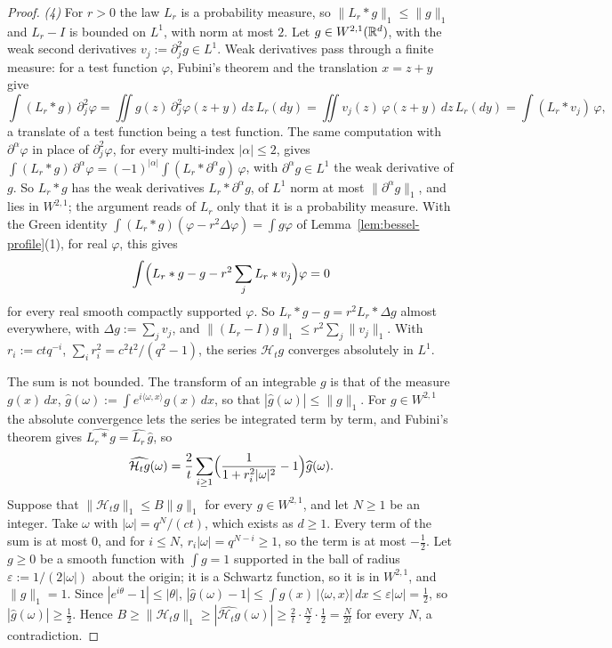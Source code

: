 \begin{proof}
\emph{(4)} For $r > 0$ the law $L_r$ is a probability measure, so $\|L_r * g\|_1 \le \|g\|_1$ and
$L_r - I$ is bounded on $L^1$, with norm at most $2$. Let $g \in W^{2,1}(\mathbb{R}^d)$, with the weak
second derivatives $v_j := \partial_j^2g \in L^1$. Weak derivatives pass through a finite measure:
for a test function $\varphi$, Fubini's theorem and the translation $x = z + y$ give
\[
  \int(L_r * g)\,\partial_j^2\varphi
   = \iint g(z)\,\partial_j^2\varphi(z + y)\,dz\,L_r(dy)
   = \iint v_j(z)\,\varphi(z + y)\,dz\,L_r(dy) = \int(L_r * v_j)\,\varphi ,
\]
a translate of a test function being a test function. The same computation with
$\partial^\alpha\varphi$ in place of $\partial_j^2\varphi$, for every multi-index $|\alpha| \le 2$,
gives $\int(L_r * g)\,\partial^\alpha\varphi = (-1)^{|\alpha|}\int(L_r * \partial^\alpha g)\,\varphi$,
with $\partial^\alpha g \in L^1$ the weak derivative of $g$. So $L_r * g$ has the weak derivatives
$L_r * \partial^\alpha g$, of $L^1$ norm at most $\|\partial^\alpha g\|_1$, and lies in
$W^{2,1}$; the argument reads of $L_r$ only that it is a probability measure. With the Green identity
$\int(L_r * g)(\varphi - r^2\Delta\varphi) = \int g\varphi$ of Lemma~\ref{lem:bessel-profile}(1),
for real $\varphi$, this gives
\[
  \int\Bigl(L_r * g - g - r^2\sum_jL_r * v_j\Bigr)\varphi = 0
\]
for every real smooth compactly supported $\varphi$. So $L_r * g - g = r^2L_r * \Delta g$ almost
everywhere, with $\Delta g := \sum_jv_j$, and $\|(L_r - I)g\|_1 \le r^2\sum_j\|v_j\|_1$. With
$r_i := ctq^{-i}$, $\sum_ir_i^2 = c^2t^2/(q^2 - 1)$, the series $\mathcal{H}_tg$ converges
absolutely in $L^1$.

The sum is not bounded. The transform of an integrable $g$ is that of the measure $g(x)\,dx$,
$\widehat g(\omega) := \int e^{i\langle\omega, x\rangle}g(x)\,dx$, so that
$|\widehat g(\omega)| \le \|g\|_1$. For $g \in W^{2,1}$ the absolute convergence lets the series
be integrated term by term, and Fubini's theorem gives $\widehat{L_r * g} = \widehat{L_r}\,\widehat g$,
so
\[
  \widehat{\mathcal{H}_tg}(\omega)
   = \frac2t\sum_{i \ge 1}\Bigl(\frac{1}{1 + r_i^2|\omega|^2} - 1\Bigr)\widehat g(\omega) .
\]
Suppose that $\|\mathcal{H}_tg\|_1 \le B\|g\|_1$ for every $g \in W^{2,1}$, and let $N \ge 1$ be an
integer. Take $\omega$ with $|\omega| = q^N/(ct)$, which exists as $d \ge 1$. Every term of the sum
is at most $0$, and for $i \le N$, $r_i|\omega| = q^{N-i} \ge 1$, so the term is at most
$-\tfrac12$. Let $g \ge 0$ be a smooth function with $\int g = 1$ supported in the ball of radius
$\varepsilon := 1/(2|\omega|)$ about the origin; it is a Schwartz function, so it is in $W^{2,1}$,
and $\|g\|_1 = 1$. Since $|e^{i\theta} - 1| \le |\theta|$,
$|\widehat g(\omega) - 1| \le \int g(x)\,|\langle\omega, x\rangle|\,dx \le \varepsilon|\omega| = \tfrac12$,
so $|\widehat g(\omega)| \ge \tfrac12$. Hence
$B \ge \|\mathcal{H}_tg\|_1 \ge |\widehat{\mathcal{H}_tg}(\omega)| \ge \frac2t\cdot\frac N2\cdot\frac12
= \frac{N}{2t}$ for every $N$, a contradiction.


\end{proof}
